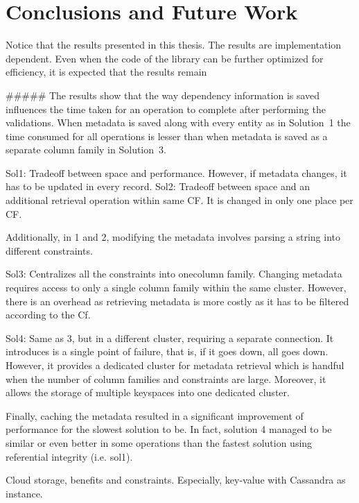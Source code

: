 \chapter{Conclusions and Future Work}

Notice that the results presented in this thesis. The results are implementation
dependent. Even when the code of the library can be further optimized for
efficiency, it is expected that the results remain 

##### The results show that the way dependency information is saved influences
the time taken for an operation to complete after performing the validations.
When metadata is saved along with every entity as in Solution~1 the time
consumed for all operations is lesser than when metadata is saved as a separate
column family in Solution~3.  

Sol1: Tradeoff between space and performance.
However, if metadata changes, it has to be updated in every record.
Sol2: Tradeoff between space and an additional retrieval operation within same
CF. It is changed in only one place per CF.
	
Additionally, in 1 and 2, modifying the metadata involves parsing a string into
different constraints.
	
Sol3: Centralizes all the constraints into onecolumn family. Changing metadata
requires access to only a single column family within the same cluster.
However, there is an overhead as retrieving metadata is more costly as it has to
be filtered according to the Cf.
	
Sol4: Same as 3, but in a different cluster, requiring a separate connection.
It introduces is a single point of failure, that is, if it goes down, all goes
down. However, it provides a dedicated cluster for metadata retrieval which is
handful when the number of column families and constraints are large.
Moreover, it allows the storage of multiple keyspaces into one dedicated
cluster.
	
Finally, caching the metadata resulted in a significant improvement of
performance for the slowest solution to be. In fact, solution 4 managed to be
similar or even better in some operations than the fastest solution using
referential integrity (i.e. sol1).
	
	
Cloud storage, benefits and constraints. Especially, key-value with Cassandra as
instance.
	

